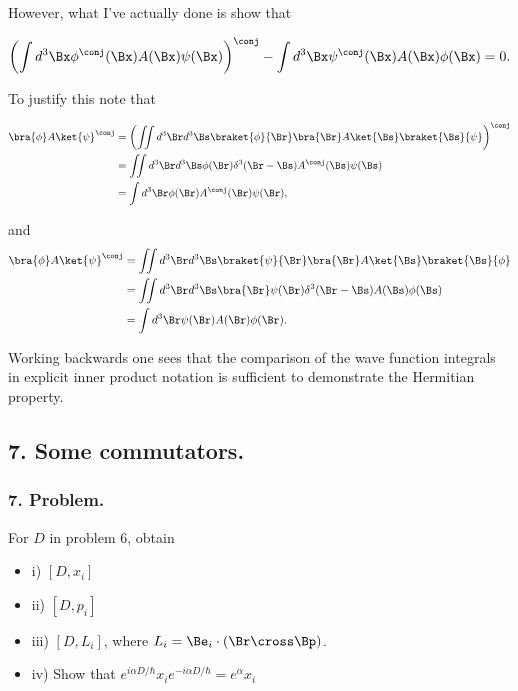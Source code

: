However, what I've actually done is show that 

\begin{align*}
\left( \int d^3 \Bx \phi^\conj (\Bx) A(\Bx) \psi(\Bx) \right)^\conj - \int d^3 \Bx \psi^\conj (\Bx) A(\Bx) \phi(\Bx) = 0.
\end{align*}

To justify this note that 

\begin{align*}
\bra{\phi} A \ket{\psi}^\conj 
&=
\left( \iint d^3 \Br d^3 \Bs \braket{\phi}{\Br} \bra{\Br} A \ket{\Bs} \braket{\Bs}{\psi} \right)^\conj \\
&=
\iint d^3 \Br d^3 \Bs \phi(\Br) \delta^3(\Br - \Bs) A^\conj(\Bs) \psi(\Bs) \\
&=
\int d^3 \Br \phi(\Br) A^\conj(\Br) \psi(\Br),
\end{align*}

and
\begin{align*}
\bra{\phi} A \ket{\psi}^\conj 
&=
\iint d^3 \Br d^3 \Bs \braket{\psi}{\Br} \bra{\Br} A \ket{\Bs} \braket{\Bs}{\phi} \\
&=
\iint d^3 \Br d^3 \Bs \bra{\Br} \psi(\Br) \delta^3(\Br - \Bs) A(\Bs) \phi(\Bs) \\
&=
\int d^3 \Br \psi(\Br) A(\Br) \phi(\Br).
\end{align*}

Working backwards one sees that the comparison of the wave function integrals in explicit inner product notation is sufficient to demonstrate the Hermitian property.

\subsection{7. Some commutators.}
\subsubsection{7. Problem.}

For $D$ in problem 6, obtain

\begin{itemize}
\item i) $[D, x_i]$
\item ii) $[D, p_i]$
\item iii) $[D, L_i]$, where $L_i = \Be_i \cdot (\Br \cross \Bp)$.
\item iv) Show that $e^{i\alpha D/\hbar} x_i e^{-i\alpha D/\hbar} = e^\alpha x_i$
\end{itemize}

